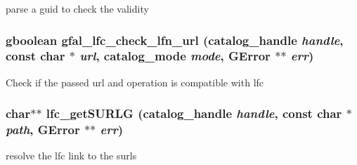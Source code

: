 parse a guid to check the validity 
\subsubsection{\setlength{\rightskip}{0pt plus 5cm}gboolean gfal\_\-lfc\_\-check\_\-lfn\_\-url (catalog\_\-handle {\em handle}, const char $\ast$ {\em url}, catalog\_\-mode {\em mode}, GError $\ast$$\ast$ {\em err})}\label{gfal__common__lfc_8h_8baa624b528deb15ff4ee61fa9948ac8}


Check if the passed url and operation is compatible with lfc 
\subsubsection{\setlength{\rightskip}{0pt plus 5cm}char$\ast$$\ast$ lfc\_\-get\-SURLG (catalog\_\-handle {\em handle}, const char $\ast$ {\em path}, GError $\ast$$\ast$ {\em err})}\label{gfal__common__lfc_8h_7c1d8699d8ad924234db163860dadf40}


resolve the lfc link to the surls 
